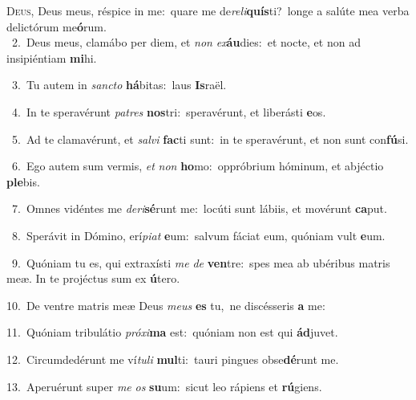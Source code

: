 \lettrine{\initial\textcolor{\initialcolor}{D}}{eus,} Deus meus, réspice in me:~\dagger quare me de\-\textit{re}\-\textit{li}\textbf{quís}ti?~\star longe a salúte mea verba delictórum me\-\textbf{ó}\-rum.\\
{\numbfont\textcolor{\numbcolor}{~2.}}~Deus meus, clamábo per diem, et \textit{non} \textit{ex}\-\textbf{áu}dies:~\star et nocte, et non ad insipiéntiam \textbf{mi}\-hi.\par
{\numbfont\textcolor{\numbcolor}{~3.}}~Tu autem in \textit{sanc}\-\textit{to} \textbf{há}\-bitas:~\star laus \textbf{Is}\-raël.\par
{\numbfont\textcolor{\numbcolor}{~4.}}~In te speravérunt \textit{pa}\-\textit{tres} \textbf{nos}\-tri:~\star speravérunt, et liberásti \textbf{e}\-os.\par
{\numbfont\textcolor{\numbcolor}{~5.}}~Ad te clamavérunt, et \textit{sal}\-\textit{vi} \textbf{fac}\-ti sunt:~\star in te speravérunt, et non sunt con\-\textbf{fú}\-si.\par
{\numbfont\textcolor{\numbcolor}{~6.}}~Ego autem sum vermis, \textit{et} \textit{non} \textbf{ho}\-mo:~\star oppróbrium hóminum, et abjéctio \textbf{ple}\-bis.\par
{\numbfont\textcolor{\numbcolor}{~7.}}~Omnes vidéntes me \textit{de}\-\textit{ri}\textbf{sé}runt me:~\star locúti sunt lábiis, et movérunt \textbf{ca}\-put.\par
{\numbfont\textcolor{\numbcolor}{~8.}}~Sperávit in Dómino, erí\-\textit{pi}\-\textit{at} \textbf{e}\-um:~\star salvum fáciat eum, quóniam vult \textbf{e}\-um.\par
{\numbfont\textcolor{\numbcolor}{~9.}}~Quóniam tu es, qui extraxísti \textit{me} \textit{de} \textbf{ven}\-tre:~\star spes mea ab ubéribus matris meæ. In te projéctus sum ex \textbf{ú}\-tero.\par
{\numbfont\textcolor{\numbcolor}{10.}}~De ventre matris meæ Deus \textit{me}\-\textit{us} \textbf{es} tu,~\star ne discésseris \textbf{a} me:\par
{\numbfont\textcolor{\numbcolor}{11.}}~Quóniam tribulátio \textit{pró}\-\textit{xi}\textbf{ma} est:~\star quóniam non est qui \textbf{ád}\-juvet.\par
{\numbfont\textcolor{\numbcolor}{12.}}~Circumdedérunt me ví\-\textit{tu}\-\textit{li} \textbf{mul}\-ti:~\star tauri pingues obse\-\textbf{dé}\-runt me.\par
{\numbfont\textcolor{\numbcolor}{13.}}~Aperuérunt super \textit{me} \textit{os} \textbf{su}\-um:~\star sicut leo rápiens et \textbf{rú}\-giens.\par
